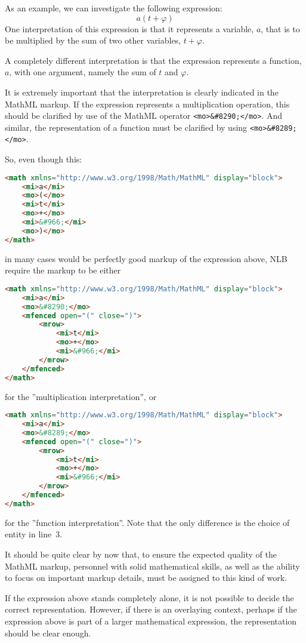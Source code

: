 \documentclass[english,a4paper,11pt]{article}
\begin{document}
As an example, we can investigate the following expression:
\begin{equation}
a (t + \varphi)
\end{equation}
One interpretation of this expression is that it represents a variable, $a$, that is to be multiplied by the sum of two other variables, $t + \varphi$.
 
A completely different interpretation is that the expression represents a function, $a$, with one argument, namely the sum of $t$ and $\varphi$.

It is extremely important that the interpretation is clearly indicated in the MathML markup. If the expression represents a multiplication operation, this should be clarified by use of the MathML operator
\verb|<mo>&#8290;</mo>|. And similar, the representation of a function must be clarified by using
\verb|<mo>&#8289;</mo>|.


So, even though this:
\begin{lstlisting}[language=HTML]
<math xmlns="http://www.w3.org/1998/Math/MathML" display="block">
	<mi>a</mi>
	<mo>(</mo>
	<mi>t</mi>
	<mo>+</mo>
	<mi>&#966;</mi>
	<mo>)</mo>
</math>
\end{lstlisting}
in many cases would be perfectly good markup of the expression above, NLB require the markup to be either
\begin{lstlisting}[language=HTML]
<math xmlns="http://www.w3.org/1998/Math/MathML" display="block">
	<mi>a</mi>
	<mo>&#8290;</mo>
	<mfenced open="(" close=")">
		<mrow>
			<mi>t</mi>
			<mo>+</mo>
			<mi>&#966;</mi>
		</mrow>
	</mfenced>
</math>
\end{lstlisting}
for the ''multiplication interpretation'', or
\begin{lstlisting}[language=HTML]
<math xmlns="http://www.w3.org/1998/Math/MathML" display="block">
	<mi>a</mi>
	<mo>&#8289;</mo>
	<mfenced open="(" close=")">
		<mrow>
			<mi>t</mi>
			<mo>+</mo>
			<mi>&#966;</mi>
		</mrow>
	</mfenced>
</math>
\end{lstlisting}
for the ''function interpretation''. Note that the only difference is the choice of entity in line~3.

It should be quite clear by now that, to ensure the expected quality of the MathML markup, personnel with solid mathematical skills, as well as the ability to focus on important markup details, must be assigned to this kind of work.


If the expression above stands completely alone, it is not possible to decide the correct representation. However, if there is an overlaying context, perhaps if the expression above is part of a larger mathematical expression, the representation should be clear enough.
\end{document}
